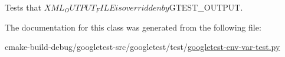 \begin{DoxyVerb}Tests that $XML_OUTPUT_FILE is overridden by $GTEST_OUTPUT.\end{DoxyVerb}
 

The documentation for this class was generated from the following file\+:\begin{DoxyCompactItemize}
\item 
cmake-\/build-\/debug/googletest-\/src/googletest/test/\mbox{\hyperlink{googletest-env-var-test_8py}{googletest-\/env-\/var-\/test.\+py}}\end{DoxyCompactItemize}
